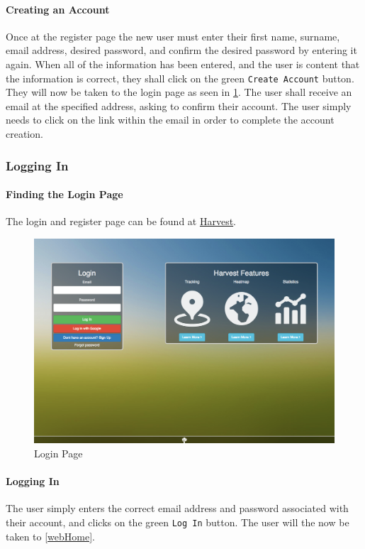 \documentclass[11pt]{article}
\begin{document}
\paragraph{Creating an Account}Once at the register page the new user must enter their first name, surname, email address, desired password, and confirm the desired password by entering it again. When all of the information has been entered, and the user is content that the information is correct, they shall click on the green \texttt{Create Account} button. They will now be taken to the login page as seen in \ref{LoginPage}. The user shall receive an email at the specified address, asking to confirm their account. The user simply needs to click on the link within the email in order to complete the account creation.

\subsubsection{Logging In}
\paragraph{Finding the Login Page}The login and register page can be found at \href{https://harvestapp.co.za}{Harvest}.

\begin{figure}
 \centering
 \includegraphics[width=12cm, keepaspectratio]{Images/GettingStarted/WebLogin.png}
 \caption{Login Page}
 \label{LoginPage}
\end{figure}

\paragraph{Logging In}The user simply enters the correct email address and password associated with their account, and clicks on the green \texttt{Log In} button. The user will the now be taken to \ref{webHome}.
\end{document}
